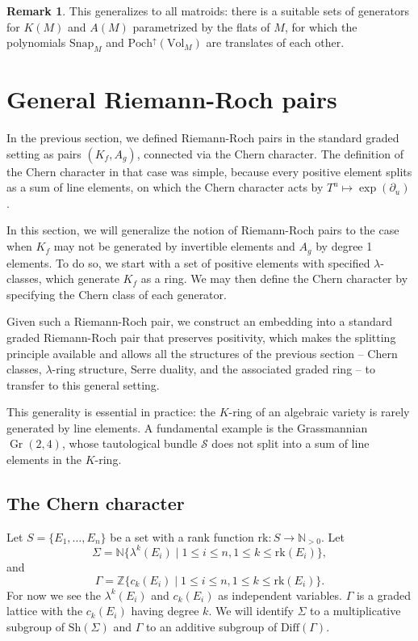 \documentclass[oneside]{amsart}
\theoremstyle{plain}
\theoremstyle{definition}
\newtheorem{remark}[theorem]{Remark}
\newcommand{\Z}{{\mathbb{Z}}}
\newcommand{\N}{{\mathbb{N}}}
\newcommand{\cS}{{\mathcal{S}}}
\newcommand{\rk}{{\mathrm{rk}}}
\newcommand{\Diff}{{\mathrm{Diff}}}
\newcommand{\Gr}{\operatorname{Gr}}
\newcommand{\Vol}{{\mathrm{Vol}}}
\newcommand{\Snap}{{\mathrm{Snap}}}
\newcommand{\Sh}{{\mathrm{Sh}}}
\newcommand{\Poch}{{\mathrm{Poch}}}
\begin{document}
\begin{remark}
    This generalizes to all matroids: there is a suitable sets of generators for $K(M)$ and $A(M)$ parametrized by the flats of $M$, for which the polynomials $\Snap_M$ and $\Poch^\uparrow(\Vol_M)$ are translates of each other.
\end{remark}

\section{General Riemann-Roch pairs}
\label{sec:hrr-pairs}

In the previous section, we defined Riemann-Roch pairs in the standard graded setting as pairs $(K_f, A_g)$, connected via the Chern character. The definition of the Chern character in that case was simple, because every positive element splits as a sum of line elements, on which the Chern character acts by $T^u \mapsto \exp(\partial_u)$.

In this section, we will generalize the notion of Riemann-Roch pairs to the case when $K_f$ may not be generated by invertible elements and $A_g$ by degree 1 elements. To do so, we start with a set of positive elements with specified $\lambda$-classes, which generate $K_f$ as a ring. We may then define the Chern character by specifying the Chern class of each generator.

Given such a Riemann-Roch pair, we construct an embedding into a standard graded Riemann-Roch pair that preserves positivity, which makes the splitting principle available and allows all the structures of the previous section -- Chern classes, $\lambda$-ring structure, Serre duality, and the associated graded ring -- to transfer to this general setting.

This generality is essential in practice: the $K$-ring of an algebraic variety is rarely generated by line elements. A fundamental example is the Grassmannian $\Gr(2,4)$, whose tautological bundle $\cS$ does not split into a sum of line elements in the $K$-ring.

\subsection{The Chern character}

Let $S = \{E_1, \dots, E_n\}$ be a set with a rank function $\rk: S \to \N_{>0}$.
Let 
\[\Sigma = \N\{\lambda^k(E_i) \mid 1 \leq i \leq n, 1 \leq k \leq \rk(E_i)\},\]
and 
\[\Gamma = \Z\{c_k(E_i) \mid 1 \leq i \leq n, 1 \leq k \leq \rk(E_i)\}.\]
For now we see the $\lambda^k(E_i)$ and $c_k(E_i)$ as independent variables. $\Gamma$ is a graded lattice with the $c_k(E_i)$ having degree $k$. We will identify $\Sigma$ to a multiplicative subgroup of $\Sh(\Sigma)$ and $\Gamma$ to an additive subgroup of $\Diff(\Gamma)$.
\end{document}
